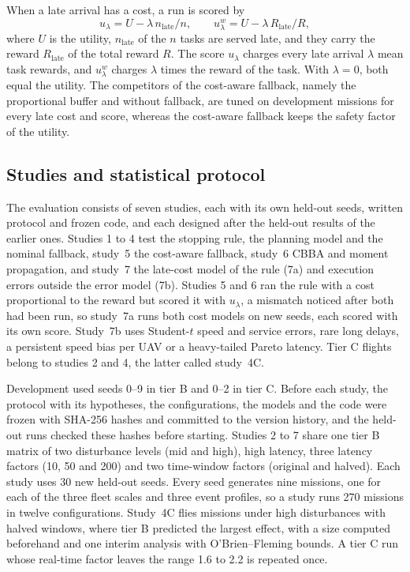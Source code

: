 When a late arrival has a cost, a run is scored by
\begin{equation}\label{eq:score}
u_\lambda=U-\lambda\,n_{\mathrm{late}}/n,\qquad u^w_\lambda=U-\lambda\,R_{\mathrm{late}}/R,
\end{equation}
where $U$ is the utility, $n_{\mathrm{late}}$ of the $n$ tasks are served late, and they carry the reward
$R_{\mathrm{late}}$ of the total reward $R$. The score $u_\lambda$ charges every late arrival $\lambda$ mean task
rewards, and $u^w_\lambda$ charges $\lambda$ times the reward of the task. With $\lambda=0$, both equal the utility. The
competitors of the cost-aware fallback, namely the proportional buffer and \mname{} without fallback, are tuned on
development missions for every late cost and score, whereas the cost-aware fallback keeps the safety factor of the
utility.

\subsection{Studies and statistical protocol}\label{sec:protocol}
The evaluation consists of seven studies, each with its own held-out seeds, written protocol and frozen code, and each
designed after the held-out results of the earlier ones. Studies 1 to 4 test the stopping rule, the planning model and
the nominal fallback, study~5 the cost-aware fallback, study~6 CBBA and moment propagation, and study~7 the late-cost
model of the rule (7a) and execution errors outside the error model (7b). Studies 5 and 6 ran the rule with a cost
proportional to the reward but scored it with $u_\lambda$, a mismatch noticed after both had been run, so study~7a runs
both cost models on new seeds, each scored with its own score. Study~7b uses Student-$t$ speed and service errors, rare
long delays, a persistent speed bias per UAV or a heavy-tailed Pareto latency. Tier C flights belong to studies 2 and
4, the latter called study~4C.

Development used seeds 0--9 in tier B and 0--2 in tier C. Before each study, the protocol with its hypotheses, the
configurations, the models and the code were frozen with SHA-256 hashes and committed to the version history, and the
held-out runs checked these hashes before starting. Studies 2 to 7 share one tier B matrix of two disturbance levels
(mid and high), high latency, three latency factors (10, 50 and 200) and two time-window factors (original and halved).
Each study uses 30 new held-out seeds. Every seed generates nine missions, one for each of the three fleet scales and
three event profiles, so a study runs 270 missions in twelve configurations. Study~4C flies  missions under high
disturbances with halved windows, where tier B predicted the largest effect, with a size computed beforehand and one
interim analysis with O'Brien--Fleming bounds. A tier C run whose real-time factor leaves the range 1.6 to 2.2 is
repeated once.

